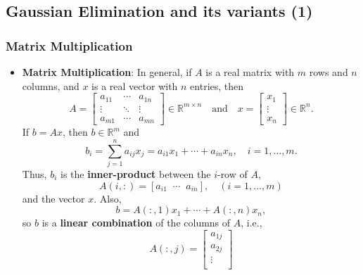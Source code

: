 \documentclass{report}
\begin{document}
    \pagebreak \bigbreak \noindent 
    \subsection{Gaussian Elimination and its variants (1)}
    \bigbreak \noindent 
    \subsubsection{Matrix Multiplication}
    \bigbreak \noindent 
    \begin{itemize}
        \item \textbf{Matrix Multiplication}:        
            In general, if $A$ is a real matrix with $m$ rows and $n$ columns, and $x$ is a real vector with $n$ entries, then
            \[
                A = 
                \begin{bmatrix}
                    a_{11} & \cdots & a_{1n} \\
                    \vdots & \ddots & \vdots \\
                    a_{m1} & \cdots & a_{mn}
                \end{bmatrix}
                \in \mathbb{R}^{m \times n}
                \quad \text{and} \quad
                x =
                \begin{bmatrix}
                    x_{1} \\
                    \vdots \\
                    x_{n}
                \end{bmatrix}
                \in \mathbb{R}^n.
            \]
            If $b = Ax$, then $b \in \mathbb{R}^m$ and
            \[
                b_i = \sum_{j=1}^n a_{ij} x_j
                = a_{i1}x_1 + \cdots + a_{in}x_n, 
                \quad i = 1, \ldots, m.
            \]
            Thus, $b_i$ is the \textbf{inner-product} between the $i$-row of $A$, 
            \[
                A(i,:) = [a_{i1} \;\; \cdots \;\; a_{in}], \quad (i = 1, \ldots, m)
            \]
            and the vector $x$.
            \bigbreak \noindent 
            Also,
            \[
                b = A(:,1) x_1 + \cdots + A(:,n)x_n,
            \]
            so $b$ is a \textbf{linear combination} of the columns of $A$, i.e.,
            \[
                A(:,j) = 
                \begin{bmatrix}
                    a_{1j} \\
                    a_{2j} \\
                    \vdots \\

\end{bmatrix}\]
\end{itemize}
\end{document}
